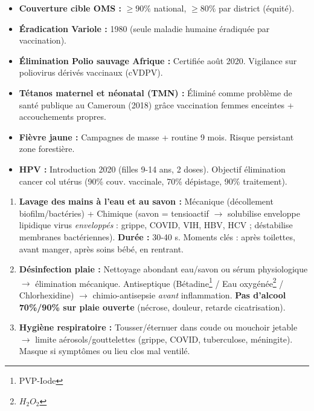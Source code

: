 \documentclass[11pt]{article}
\begin{document}
\begin{exemplebox}
\begin{itemize}
    \item \textbf{Couverture cible OMS :} $\ge 90\%$ national, $\ge 80\%$ par district (équité).
    \item \textbf{Éradication Variole :} 1980 (seule maladie humaine éradiquée par vaccination).
    \item \textbf{Élimination Polio sauvage Afrique :} Certifiée août 2020. Vigilance sur poliovirus dérivés vaccinaux (cVDPV).
    \item \textbf{Tétanos maternel et néonatal (TMN) :} Éliminé comme problème de santé publique au Cameroun (2018) gr\^ace vaccination femmes enceintes + accouchements propres.
    \item \textbf{Fièvre jaune :} Campagnes de masse + routine 9 mois. Risque persistant zone forestière.
    \item \textbf{HPV :} Introduction 2020 (filles 9-14 ans, 2 doses). Objectif élimination cancer col utérus (90\% couv. vaccinale, 70\% dépistage, 90\% traitement).
\end{itemize}
\end{exemplebox}

\begin{methode}
\begin{enumerate}
    \item \textbf{Lavage des mains à l'eau et au savon :} Mécanique (décollement biofilm/bactéries) + Chimique (savon = tensioactif $\rightarrow$ solubilise enveloppe lipidique virus \emph{enveloppés} : grippe, COVID, VIH, HBV, HCV ; déstabilise membranes bactériennes). \textbf{Durée :} 30-40 s. Moments clés : après toilettes, avant manger, après soins bébé, en rentrant.
    \item \textbf{Désinfection plaie :} Nettoyage abondant eau/savon ou sérum physiologique $\rightarrow$ élimination mécanique. Antiseptique (Bétadine\footnote{\textregistered PVP-Iode} / Eau oxygénée\footnote{$H_2O_2$} / Chlorhexidine) $\rightarrow$ chimio-antisepsie \emph{avant} inflammation. \textbf{Pas d'alcool 70\%/90\% sur plaie ouverte} (nécrose, douleur, retarde cicatrisation).
    \item \textbf{Hygiène respiratoire :} Tousser/éternuer dans coude ou mouchoir jetable $\rightarrow$ limite aérosols/gouttelettes (grippe, COVID, tuberculose, méningite). Masque si symptômes ou lieu clos mal ventilé.
\end{enumerate}
\end{methode}
\end{document}
